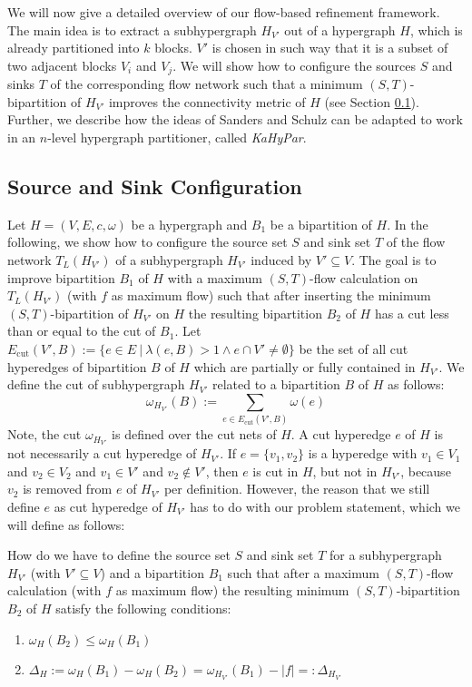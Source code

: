 We will now give a detailed overview of our flow-based refinement framework. The main
idea is to extract a subhypergraph $H_{V'}$ out of a hypergraph $H$, which is already
partitioned into $k$ blocks. $V'$ is chosen in such way that it is a subset of two
adjacent blocks $V_i$ and $V_j$. We will show how to configure
the sources $S$ and sinks $T$ of the corresponding flow network such that
a minimum $(S,T)$-bipartition of $H_{V'}$ improves the connectivity metric of $H$
(see Section \ref{sec:source_and_sink}). Further, we describe how the ideas of
Sanders and Schulz \cite{sanders2011engineering} 
can be adapted to work in an $n$-level hypergraph partitioner, called \emph{KaHyPar}. 

\subsection{Source and Sink Configuration}
\label{sec:source_and_sink}

Let $H = (V,E,c,\omega)$ be a hypergraph and $B_1$ be a bipartition of $H$.
In the following, we show how to configure the source set $S$ and sink set $T$ of the flow
network $T_L(H_{V'})$ of a subhypergraph $H_{V'}$ induced by $V' \subseteq V$. The goal is 
to improve bipartition $B_1$ of $H$ with a maximum $(S,T)$-flow calculation 
on $T_L(H_{V'})$ (with $f$ as maximum flow) such that after inserting the minimum 
$(S,T)$-bipartition of $H_{V'}$ on $H$ the resulting bipartition $B_2$ of $H$ has a 
cut less than or equal to the cut of $B_1$.
Let $E_{\text{cut}}(V',B) := \{ e \in E\ |\ \lambda(e,B) > 1 \land e \cap V' \neq \emptyset\}$ 
be the set of all cut hyperedges of bipartition $B$ of $H$ which are partially or fully contained in $H_{V'}$.
We define the cut of subhypergraph $H_{V'}$ related to a bipartition $B$ of $H$
as follows:
\[\omega_{H_{V'}}(B) := \sum_{e \in E_{\text{cut}}(V',B)} \omega(e) \]
Note, the cut $\omega_{H_{V'}}$ is defined over the
cut nets of $H$. A cut hyperedge $e$ of $H$ is not necessarily a cut hyperedge
of $H_{V'}$. If $e = \{v_1,v_2\}$ is a hyperedge with $v_1 \in V_1$ and $v_2 \in V_2$ and
$v_1 \in V'$ and $v_2 \notin V'$, then $e$ is cut in $H$, but not in $H_{V'}$, because
$v_2$ is removed from $e$ of $H_{V'}$ per definition. However, the reason that we still
define $e$ as cut hyperedge of $H_{V'}$ has to do with our problem statement, 
which we will define as follows:

\begin{problem}
\label{prob:ST} 
How do we have to define the source set $S$ and sink set $T$ for a subhypergraph $H_{V'}$ 
(with $V' \subseteq V$) and a bipartition $B_1$ such that 
after a maximum $(S,T)$-flow calculation (with $f$ as maximum flow)
the resulting minimum $(S,T)$-bipartition $B_2$ of $H$ satisfy the following conditions:
\begin{enumerate}
\item $\omega_H(B_2) \le \omega_H(B_1)$
\item $\Delta_{H} := \omega_H(B_1) - \omega_H(B_2) = \omega_{H_{V'}}(B_1) - |f| =: \Delta_{H_{V'}}$
\end{enumerate}
\end{problem}

